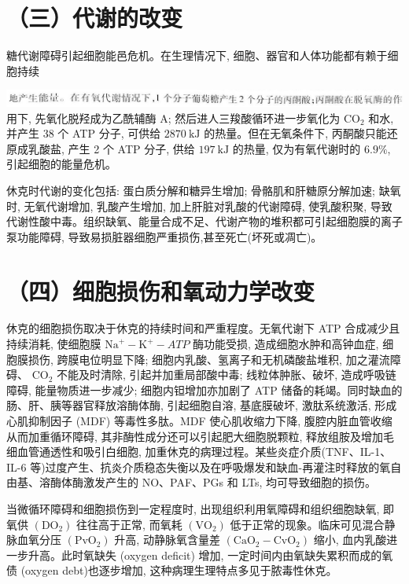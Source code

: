 \documentclass[10pt]{article}
\begin{document}
\section*{（三）代谢的改变}
糖代谢障碍引起细胞能邑危机。在生理情况下, 细胞、器官和人体功能都有赖于细胞持续

\includegraphics[max width=\textwidth, center]{2024_07_09_002a177993bd97d1d6d7g-194}\\
用下, 先氧化脱羟成为乙酰辅酶 $\mathrm{A}$; 然后进人三羧酸循环进一步氧化为 $\mathrm{CO}_{2}$ 和水, 并产生 38 个 ATP 分子, 可供给 $2870 \mathrm{~kJ}$ 的热量。但在无氧条件下, 丙酮酸只能还原成乳酸盐, 产生 2 个 ATP 分子, 供给 $197 \mathrm{~kJ}$ 的热量, 仅为有氧代谢时的 $6.9 \%$, 引起细胞的能量危机。

休克时代谢的变化包括: 蛋白质分解和糖异生增加; 骨骼肌和肝糖原分解加速; 缺氧时, 无氧代谢增加, 乳酸产生增加, 加上肝脏对乳酸的代谢障碍, 使乳酸积聚, 导致代谢性酸中毒。组织缺氧、能量合成不足、代谢产物的堆积都可引起细胞膜的离子泵功能障碍, 导致易损脏器细胞严重损伤,甚至死亡(坏死或凋亡)。

\section*{（四）细胞损伤和氧动力学改变}
休克的细胞损伤取决于休克的持续时间和严重程度。无氧代谢下 ATP 合成减少且持续消耗, 使细胞膜 $\mathrm{Na}^{+}-\mathrm{K}^{+}-A T P$ 酶功能受损, 造成细胞水肿和高钟血症, 细胞膜损伤, 跨膜电位明显下降; 细胞内乳酸、氢离子和无机磷酸盐堆积, 加之灌流障碍、 $\mathrm{CO}_{2}$ 不能及时清除, 引起并加重局部酸中毒; 线粒体肿胀、破坏, 造成呼吸链障碍, 能量物质进一步减少; 细胞内钽增加亦加剧了 ATP 储备的耗竭。同时缺血的肠、肝、胰等器官释放溶酶体酶, 引起细胞自溶, 基底膜破坏, 激肽系统激活, 形成心肌抑制因子 (MDF) 等毒性多肽。MDF 使心肌收缩力下降, 腹腔内脏血管收缩从而加重循环障碍, 其非酶性成分还可以引起肥大细胞脱颗粒, 释放组胺及增加毛细血管通透性和吸引白细胞, 加重休克的病理过程。某些炎症介质(TNF、IL-1、IL-6 等)过度产生、抗炎介质稳态失衡以及在呼吸爆发和缺血-再灌注时释放的氧自由基、溶酶体酶激发产生的 NO、PAF、PGs 和 LTs, 均可导致细胞的损伤。

当微循环障碍和细胞损伤到一定程度时, 出现组织利用氧障碍和组织细胞缺氧, 即氧供 $\left(\mathrm{DO}_{2}\right)$ 往往高于正常, 而氧耗 $\left(\mathrm{VO}_{2}\right)$ 低于正常的现象。临床可见混合静脉血氧分压 $\left(\mathrm{PvO}_{2}\right)$ 升高, 动静脉氧含量差 $\left(\mathrm{CaO}_{2}-\mathrm{CvO}_{2}\right)$ 缩小, 血内乳酸进一步升高。此时氧缺失 (oxygen deficit) 增加, 一定时间内由氧缺失累积而成的氧债 (oxygen debt)也逐步增加, 这种病理生理特点多见于脓毒性休克。
\end{document}
